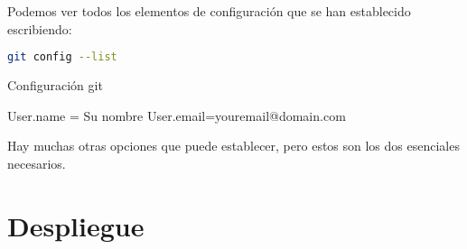 Podemos ver todos los elementos de configuración que se han establecido escribiendo:

\begin{lstlisting}[language=bash]
git config --list
\end{lstlisting}

Configuración git

User.name = Su nombre
User.email=youremail@domain.com

Hay muchas otras opciones que puede establecer, pero estos son los dos esenciales necesarios.


\section{Despliegue}




